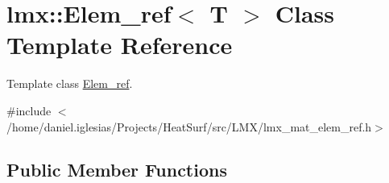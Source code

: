 \hypertarget{classlmx_1_1Elem__ref}{\section{lmx\-:\-:Elem\-\_\-ref$<$ T $>$ Class Template Reference}
\label{classlmx_1_1Elem__ref}
}


Template class \hyperlink{classlmx_1_1Elem__ref}{Elem\-\_\-ref}.  




{\ttfamily \#include $<$/home/daniel.\-iglesias/\-Projects/\-Heat\-Surf/src/\-L\-M\-X/lmx\-\_\-mat\-\_\-elem\-\_\-ref.\-h$>$}

\subsection*{Public Member Functions}
